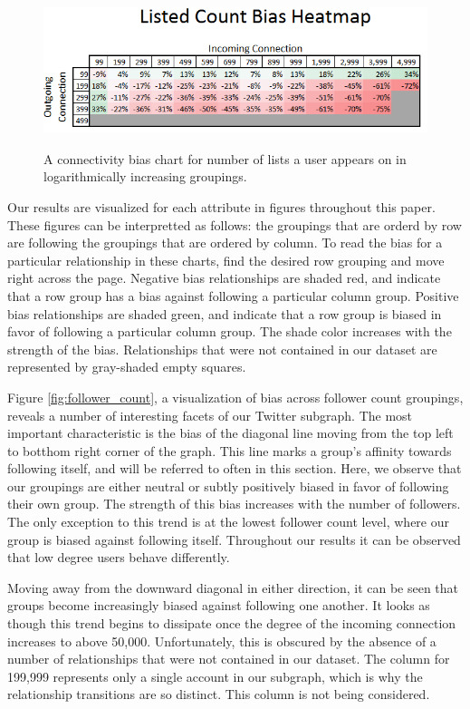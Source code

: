 \begin{figure}[t]
 \centering
 \includegraphics[bb=0 0 496 163,scale=.6]{./images/listed_count.png}
 \label{fig:listed_count}
 \caption{A connectivity bias chart for number of lists a user appears on in logarithmically increasing groupings.}
\end{figure}


Our results are visualized for each attribute in figures throughout this paper.  These figures can be interpretted as follows: the groupings that are orderd by row are following the groupings that are ordered by column.  To read the bias for a particular relationship in these charts, find the desired row grouping and move right across the page.  Negative bias relationships are shaded red, and indicate that a row group has a bias against following a particular column group.  Positive bias relationships are shaded green, and indicate that a row group is biased in favor of following a particular column group.  The shade color increases with the strength of the bias.  Relationships that were not contained in our dataset are represented by gray-shaded empty squares.

Figure \ref{fig:follower_count}, a visualization of bias across follower count groupings, reveals a number of interesting facets of our Twitter subgraph.  The most important characteristic is the bias of the diagonal line moving from the top left to botthom right corner of the graph.  This line marks a group's affinity towards following itself, and will be referred to often in this section.  Here, we observe that our groupings are either neutral or subtly positively biased in favor of following their own group.  The strength of this bias increases with the number of followers.  The only exception to this trend is at the lowest follower count level, where our group is biased against following itself.  Throughout our results it can be observed that low degree users behave differently.

Moving away from the downward diagonal in either direction, it can be seen that groups become increasingly biased against following one another.  It looks as though this trend begins to dissipate once the degree of the incoming connection increases to above 50,000.  Unfortunately, this is obscured by the absence of a number of relationships that were not contained in our dataset.  The column for 199,999 represents only a single account in our subgraph, which is why the relationship transitions are so distinct.  This column is not being considered.

